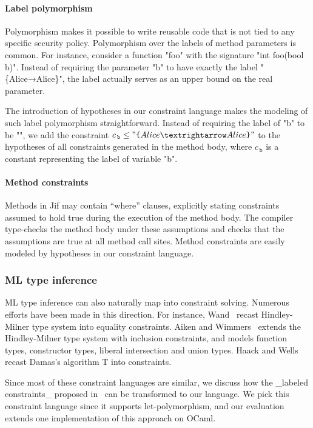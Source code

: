 \paragraph{Label polymorphism}

Polymorphism makes it possible to write reusable code that is not tied
to any specific security policy. Polymorphism
over the labels of method parameters is common.
For instance, consider a function "foo"
with the signature "int foo(bool b)".
Instead of requiring the parameter "b" to have exactly the label
"\{Alice→Alice\}", the label actually serves as an upper bound on the
real parameter.

The introduction of hypotheses in our constraint language makes the
modeling of such label polymorphism straightforward. Instead of
requiring the label of "b" to
be "", we add the constraint $c_{\,\texttt{b}} \leq
"\lab{Alice→Alice}"$ to the hypotheses of all constraints generated in the
method body, where $c_{\,\texttt{b}}$ is a constant representing the label of
variable "b".

\paragraph{Method constraints}

Methods in Jif may contain ``where'' clauses, explicitly stating
constraints assumed to hold true during the execution of the method
body. The compiler type-checks the method body under these assumptions
and checks that the assumptions are true at all method call sites. 
Method constraints are easily modeled by hypotheses in our
constraint language.
 
\subsubsection{ML type inference}

ML type inference can also naturally map into constraint solving. Numerous 
efforts have been made in this direction. For instance,
Wand~\cite{wand-typeinference} recast Hindley-Milner type system into equality
constraints. Aiken and Wimmers~\cite{aiken-typeinclusion} extends the
Hindley-Milner type system with inclusion constraints, and models function
types, constructor types, liberal intersection and union types. Haack and Wells
~\cite{haack:slicing} recast Damas’s algorithm T into constraints.

Since most of these constraint languages are similar, we discuss how
the _labeled constraints_ proposed in~\cite{haack:slicing} can be
transformed to our language. We pick this constraint language since it
supports let-polymorphism, and our evaluation extends one
implementation of this approach on OCaml.

